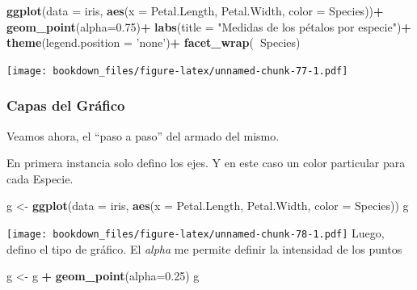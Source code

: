 \documentclass[]{book}
\newenvironment{Shaded}{\begin{snugshade}}{\end{snugshade}}
\newcommand{\DataTypeTok}[1]{\textcolor[rgb]{0.13,0.29,0.53}{#1}}
\newcommand{\FloatTok}[1]{\textcolor[rgb]{0.00,0.00,0.81}{#1}}
\newcommand{\KeywordTok}[1]{\textcolor[rgb]{0.13,0.29,0.53}{\textbf{#1}}}
\newcommand{\NormalTok}[1]{#1}
\newcommand{\OperatorTok}[1]{\textcolor[rgb]{0.81,0.36,0.00}{\textbf{#1}}}
\newcommand{\StringTok}[1]{\textcolor[rgb]{0.31,0.60,0.02}{#1}}
\begin{document}
\begin{Shaded}
\begin{Highlighting}[]
\KeywordTok{ggplot}\NormalTok{(}\DataTypeTok{data =}\NormalTok{ iris, }\KeywordTok{aes}\NormalTok{(}\DataTypeTok{x =}\NormalTok{ Petal.Length, Petal.Width, }\DataTypeTok{color =}\NormalTok{ Species))}\OperatorTok{+}
\StringTok{  }\KeywordTok{geom_point}\NormalTok{(}\DataTypeTok{alpha=}\FloatTok{0.75}\NormalTok{)}\OperatorTok{+}
\StringTok{  }\KeywordTok{labs}\NormalTok{(}\DataTypeTok{title =} \StringTok{"Medidas de los pétalos por especie"}\NormalTok{)}\OperatorTok{+}
\StringTok{  }\KeywordTok{theme}\NormalTok{(}\DataTypeTok{legend.position =} \StringTok{'none'}\NormalTok{)}\OperatorTok{+}
\StringTok{  }\KeywordTok{facet_wrap}\NormalTok{(}\OperatorTok{~}\NormalTok{Species)}
\end{Highlighting}
\end{Shaded}

\texttt{[image: bookdown\_files/figure-latex/unnamed-chunk-77-1.pdf]}

\hypertarget{capas-del-grafico}{%
\subsubsection{Capas del Gráfico}\label{capas-del-grafico}}

Veamos ahora, el ``paso a paso'' del armado del mismo.

En primera instancia solo defino los ejes. Y en este caso un color particular para cada Especie.

\begin{Shaded}
\begin{Highlighting}[]
\NormalTok{g <-}\StringTok{ }\KeywordTok{ggplot}\NormalTok{(}\DataTypeTok{data =}\NormalTok{ iris, }\KeywordTok{aes}\NormalTok{(}\DataTypeTok{x =}\NormalTok{ Petal.Length, Petal.Width, }\DataTypeTok{color =}\NormalTok{ Species))}
\NormalTok{g}
\end{Highlighting}
\end{Shaded}

\texttt{[image: bookdown\_files/figure-latex/unnamed-chunk-78-1.pdf]}
Luego, defino el tipo de gráfico. El \emph{alpha} me permite definir la intensidad de los puntos

\begin{Shaded}
\begin{Highlighting}[]
\NormalTok{g <-}\StringTok{ }\NormalTok{g }\OperatorTok{+}\StringTok{  }\KeywordTok{geom_point}\NormalTok{(}\DataTypeTok{alpha=}\FloatTok{0.25}\NormalTok{)}
\NormalTok{g}
\end{Highlighting}
\end{Shaded}
\end{document}
